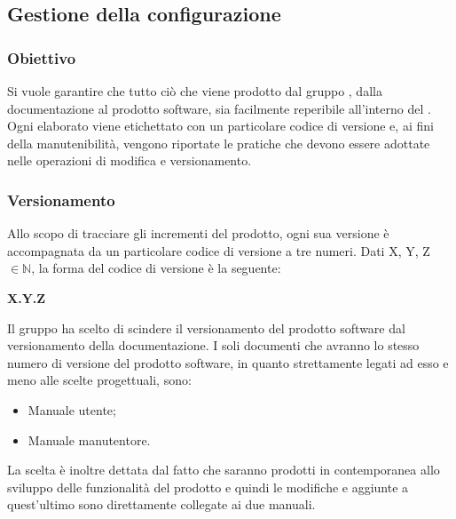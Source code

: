 \subsection{Gestione della configurazione}
\subsubsection{Obiettivo}
Si vuole garantire che tutto ciò che viene prodotto dal gruppo \Gruppo{}, dalla documentazione al prodotto software, sia facilmente reperibile all’interno del .
Ogni elaborato viene etichettato con un particolare codice di versione e, ai fini della manutenibilità, vengono riportate le pratiche che devono essere adottate nelle operazioni di modifica e versionamento.

\subsubsection{Versionamento}
Allo scopo di tracciare gli incrementi del prodotto, ogni sua versione è accompagnata da un particolare codice di versione a tre numeri. Dati X, Y, Z $\in \mathbb{N}$, la forma del codice di versione è la seguente:
\begin{center}
	\textbf{X.Y.Z}
\end{center}
Il gruppo ha scelto di scindere il versionamento del prodotto software dal versionamento della documentazione.
I soli documenti che avranno lo stesso numero di versione del prodotto software, in quanto strettamente legati ad esso e meno alle scelte progettuali, sono:
\begin{itemize}
	\item Manuale utente;
	\item Manuale manutentore.
\end{itemize}
La scelta è inoltre dettata dal fatto che saranno prodotti in contemporanea allo sviluppo delle funzionalità del prodotto e quindi le modifiche e aggiunte a quest'ultimo sono direttamente collegate ai due manuali.

